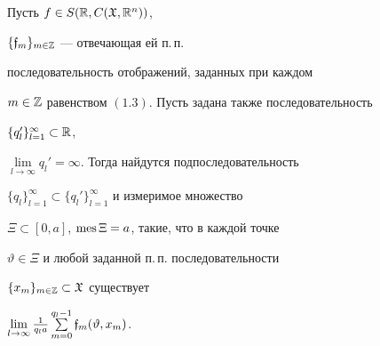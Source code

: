 \begin{lems}


Пусть $f\in S(\Bbb R,C({\frak X},\Bbb R^n))$,


$\{\frak f_m\}_{m\in\Bbb Z}$ --- отвечающая ей п.\,п.


последовательность отображений, заданных при каждом


$m\in\Bbb Z$ равенством $(1.3)$. Пусть задана также последовательность


$\{q_l'\}_{l=1}^{\infty}\subset\Bbb R$,


$\lim\limits_{l\to\infty}q_l'=\infty$. Тогда найдутся подпоследовательность


$\{q_l\}_{l=1}^{\infty}\subset\{q_l'\}_{l=1}^{\infty}$ и измеримое множество


$\Xi\subset[0,a]$, $\operatorname{mes}\Xi=a$, такие, что в каждой точке


$\vartheta\in\Xi$ и любой заданной п.\,п. последовательности


$\{x_m\}_{m\in\Bbb Z}\subset\frak X$ существует


$\lim\limits_{l\to\infty}\frac{1}{q_la}\sum\limits_{m=0}^{q_l-1}


\frak f_m(\vartheta,x_m)$.


\end{lems}








